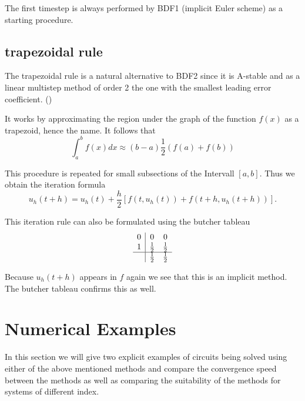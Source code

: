	The first timestep is always performed by BDF1 (implicit Euler scheme) as a starting procedure.
	
	
\subsection{trapezoidal rule}

	The trapezoidal rule is a natural alternative to BDF2 since it is A-stable and as a linear multistep method of order 2 the one with the smallest leading error coefficient. (\cite{ModellingAndDiscretizationOfCircuitProblems})
	
	It works by approximating the region under the graph of the function $f(x)$ as a trapezoid, hence the name. It follows that	
	\begin{displaymath}
		\int_{a}^{b} f(x) dx \approx (b-a)\frac{1}{2} (f(a)+f(b))
	\end{displaymath}
	
	This procedure is repeated for small subsections of the Intervall $[a,b]$. Thus we obtain the iteration formula
	\begin{displaymath}
		u_h (t+h) = u_h(t) +\frac{h}{2}[f(t,u_h(t)) + f(t+h, u_h(t+h))].
	\end{displaymath}
	
	This iteration rule can also be formulated using the butcher tableau	
	\begin{displaymath}
		\begin{array}{c|cc}
			0 & 0 & 0 \\
			1 & \frac{1}{2} & \frac{1}{2} \\
			\hline
			& \frac{1}{2} & \frac{1}{2}
		\end{array}
	\end{displaymath}
	
	Because $u_h(t+h)$ appears in $f$ again we see that this is an implicit method. The butcher tableau confirms this as well.
	
\section{Numerical Examples}
	
	In this section we will give two explicit examples of circuits being solved using either of the above mentioned methods and compare the convergence speed between the methods as well as comparing the suitability of the methods for systems of different index.
	


		
		
	
	
	